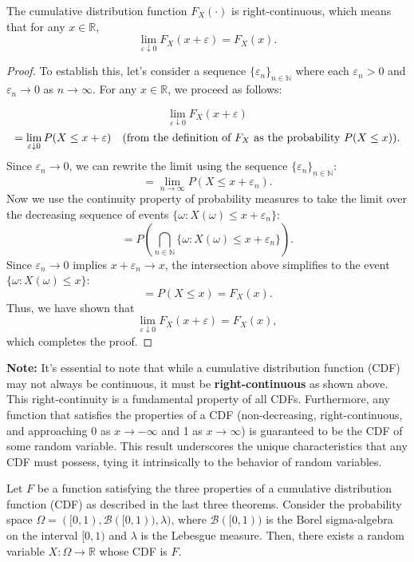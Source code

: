 \begin{theorem}
    The cumulative distribution function \( F_X(\cdot) \) is right-continuous, which means that for any \( x \in \mathbb{R} \),
\[
\lim_{\varepsilon \downarrow 0} F_X(x + \varepsilon) = F_X(x).
\]
\end{theorem}

\begin{proof}
    To establish this, let's consider a sequence \( \{\varepsilon_n\}_{n \in \mathbb{N}} \) where each \( \varepsilon_n > 0 \) and \( \varepsilon_n \to 0 \) as \( n \to \infty \). For any \( x \in \mathbb{R} \), we proceed as follows:

\[
\lim_{\varepsilon \downarrow 0} F_X(x + \varepsilon)
\]
\[
= \lim_{\varepsilon \downarrow 0} P(X \leq x + \varepsilon) \quad \text{(from the definition of \( F_X \) as the probability \( P(X \leq x) \))}.
\]
Since \( \varepsilon_n \to 0 \), we can rewrite the limit using the sequence \( \{\varepsilon_n\}_{n \in \mathbb{N}} \):
\[
= \lim_{n \to \infty} P(X \leq x + \varepsilon_n).
\]
Now we use the continuity property of probability measures to take the limit over the decreasing sequence of events \( \{ \omega : X(\omega) \leq x + \varepsilon_n \} \):
\[
= P\left( \bigcap_{n \in \mathbb{N}} \{ \omega : X(\omega) \leq x + \varepsilon_n \} \right).
\]
Since \( \varepsilon_n \to 0 \) implies \( x + \varepsilon_n \to x \), the intersection above simplifies to the event \( \{ \omega : X(\omega) \leq x \} \):
\[
= P(X \leq x) = F_X(x).
\]
Thus, we have shown that
\[
\lim_{\varepsilon \downarrow 0} F_X(x + \varepsilon) = F_X(x),
\]
which completes the proof.
\end{proof}

\textbf{Note:} It’s essential to note that while a cumulative distribution function (CDF) may not always be continuous, it must be \textbf{right-continuous} as shown above. This right-continuity is a fundamental property of all CDFs. Furthermore, any function that satisfies the properties of a CDF (non-decreasing, right-continuous, and approaching 0 as \( x \to -\infty \) and 1 as \( x \to \infty \)) is guaranteed to be the CDF of some random variable. This result underscores the unique characteristics that any CDF must possess, tying it intrinsically to the behavior of random variables.

\begin{theorem}
    Let \( F \) be a function satisfying the three properties of a cumulative distribution function (CDF) as described in the last three theorems. Consider the probability space \( \Omega = ([0, 1), \mathcal{B}([0, 1)), \lambda) \), where \( \mathcal{B}([0, 1)) \) is the Borel sigma-algebra on the interval \( [0, 1) \) and \( \lambda \) is the Lebesgue measure. Then, there exists a random variable \( X: \Omega \rightarrow \mathbb{R} \) whose CDF is \( F \).
\end{theorem}

